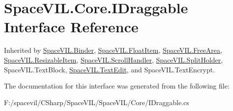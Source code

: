 \hypertarget{interface_space_v_i_l_1_1_core_1_1_i_draggable}{}\section{Space\+V\+I\+L.\+Core.\+I\+Draggable Interface Reference}
\label{interface_space_v_i_l_1_1_core_1_1_i_draggable}


Inherited by \mbox{\hyperlink{class_space_v_i_l_1_1_binder}{Space\+V\+I\+L.\+Binder}}, \mbox{\hyperlink{class_space_v_i_l_1_1_float_item}{Space\+V\+I\+L.\+Float\+Item}}, \mbox{\hyperlink{class_space_v_i_l_1_1_free_area}{Space\+V\+I\+L.\+Free\+Area}}, \mbox{\hyperlink{class_space_v_i_l_1_1_resizable_item}{Space\+V\+I\+L.\+Resizable\+Item}}, \mbox{\hyperlink{class_space_v_i_l_1_1_scroll_handler}{Space\+V\+I\+L.\+Scroll\+Handler}}, \mbox{\hyperlink{class_space_v_i_l_1_1_split_holder}{Space\+V\+I\+L.\+Split\+Holder}}, Space\+V\+I\+L.\+Text\+Block, \mbox{\hyperlink{class_space_v_i_l_1_1_text_edit}{Space\+V\+I\+L.\+Text\+Edit}}, and Space\+V\+I\+L.\+Text\+Encrypt.



The documentation for this interface was generated from the following file\+:\begin{DoxyCompactItemize}
\item 
F\+:/spacevil/\+C\+Sharp/\+Space\+V\+I\+L/\+Space\+V\+I\+L/\+Core/I\+Draggable.\+cs\end{DoxyCompactItemize}
